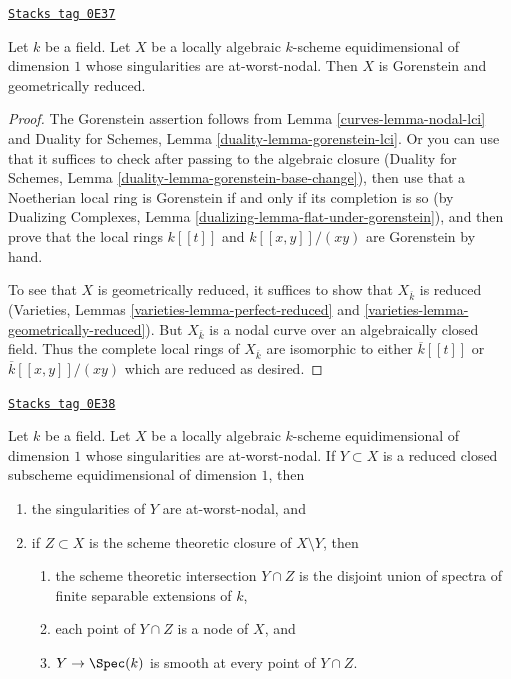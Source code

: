 \begin{lemma}
\label{curves-lemma-facts-about-nodal-curves}
\href{https://stacks.math.columbia.edu/tag/0E37}{\texttt{Stacks tag 0E37}}

Let $k$ be a field. Let $X$ be a locally algebraic $k$-scheme
equidimensional of dimension $1$ whose singularities are at-worst-nodal.
Then $X$ is Gorenstein and geometrically reduced.
\end{lemma}

\begin{proof}

The Gorenstein assertion follows from Lemma \ref{curves-lemma-nodal-lci}
and Duality for Schemes, Lemma \ref{duality-lemma-gorenstein-lci}.
Or you can use that it suffices to check after passing to the
algebraic closure (Duality for Schemes, Lemma
\ref{duality-lemma-gorenstein-base-change}), then use that
a Noetherian local ring is Gorenstein if and only if its
completion is so (by Dualizing Complexes, Lemma
\ref{dualizing-lemma-flat-under-gorenstein}), and
then prove that the local rings $k[[t]]$ and $k[[x, y]]/(xy)$
are Gorenstein by hand.

\medskip\noindent
To see that $X$ is geometrically reduced, it suffices to show that
$X_{\overline{k}}$ is reduced (Varieties, Lemmas
\ref{varieties-lemma-perfect-reduced} and
\ref{varieties-lemma-geometrically-reduced}).
But $X_{\overline{k}}$ is a nodal curve over an
algebraically closed field. Thus the complete local rings
of $X_{\overline{k}}$ are isomorphic to either
$\overline{k}[[t]]$ or $\overline{k}[[x, y]]/(xy)$
which are reduced as desired.
\end{proof}

\begin{lemma}
\label{curves-lemma-closed-subscheme-nodal-curve}
\href{https://stacks.math.columbia.edu/tag/0E38}{\texttt{Stacks tag 0E38}}

Let $k$ be a field. Let $X$ be a locally algebraic $k$-scheme
equidimensional of dimension $1$ whose singularities are at-worst-nodal.
If $Y \subset X$ is a reduced closed subscheme
equidimensional of dimension $1$, then
\begin{enumerate}
\item the singularities of $Y$ are at-worst-nodal, and
\item if $Z \subset X$ is the scheme theoretic closure of
$X \setminus Y$, then
\begin{enumerate}
\item the scheme theoretic intersection $Y \cap Z$ is
the disjoint union of spectra of finite separable extensions of $k$,
\item each point of $Y \cap Z$ is a node of $X$, and
\item $Y \to \Spec(k)$ is smooth at every point of $Y \cap Z$.
\end{enumerate}
\end{enumerate}
\end{lemma}

